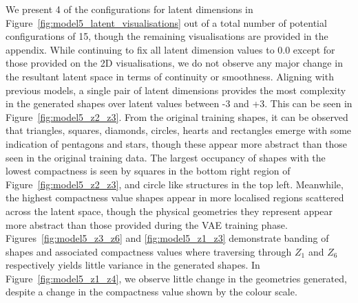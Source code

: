 \documentclass{article}
\begin{document}
We present 4 of the configurations for latent dimensions in Figure~\ref{fig:model5_latent_visualisations} out of a total number of potential configurations of 15, though the remaining visualisations are provided in the appendix. While continuing to fix all latent dimension values to 0.0 except for those provided on the 2D visualisations, we do not observe any major change in the resultant latent space in terms of continuity or smoothness. Aligning with previous models, a single pair of latent dimensions provides the most complexity in the generated shapes over latent values between -3 and +3. This can be seen in Figure~\ref{fig:model5_z2_z3}. From the original training shapes, it can be observed that triangles, squares, diamonds, circles, hearts and rectangles emerge with some indication of pentagons and stars, though these appear more abstract than those seen in the original training data. The largest occupancy of shapes with the lowest compactness is seen by squares in the bottom right region of Figure~\ref{fig:model5_z2_z3}, and circle like structures in the top left. Meanwhile, the highest compactness value shapes appear in more localised regions scattered across the latent space, though the physical geometries they represent appear more abstract than those provided during the VAE training phase. Figures~\ref{fig:model5_z3_z6} and \ref{fig:model5_z1_z3} demonstrate banding of shapes and associated compactness values where traversing through $Z_1$ and $Z_6$ respectively yields little variance in the generated shapes. In Figure~\ref{fig:model5_z1_z4}, we observe little change in the geometries generated, despite a change in the compactness value shown by the colour scale.
\end{document}
